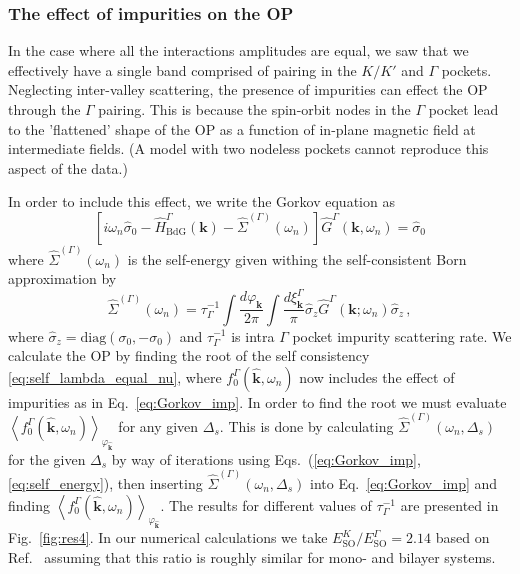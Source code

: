 \documentclass[showpacs,superscriptaddress,onecolumn,prb]{revtex4}
\begin{document}
\subsubsection{The effect of impurities on the OP}
\label{sec:Impurities}
In the case where all the interactions amplitudes are equal, we saw
that we effectively have a single band comprised of pairing in the
$K/K'$ and $\Gamma$ pockets. Neglecting inter-valley scattering, the presence of impurities can effect
the OP through the $\Gamma$ pairing. This is because the spin-orbit nodes in the $\Gamma$ pocket lead to the 'flattened' shape of the OP as a function of in-plane magnetic field at intermediate fields. (A model with two nodeless pockets cannot reproduce this aspect of the data.)

In order to include this effect, we write the Gorkov equation as
\begin{equation}
\label{eq:Gorkov_imp}
\left[i\omega_{n}\hat{\sigma}_{0}-\hat{H}_{\mathrm{BdG}}^{\Gamma}\left(\mathbf{k}\right)-\hat{\Sigma}^{\left(\Gamma\right)}\left(\omega_{n}\right)\right]\hat{G}^{\Gamma}\left(\mathbf{k},\omega_{n}\right)=\hat{\sigma}_{0}
\end{equation}
where $\hat{\Sigma}^{\left(\Gamma\right)}\left(\omega_{n}\right)$
is the self-energy given withing the self-consistent Born approximation
by \cite{Wickramaratne2021}
\begin{equation}
\label{eq:self_energy}
\hat{\Sigma}^{\left(\Gamma\right)}\left(\omega_{n}\right)=\tau^{-1}_{\Gamma}\int\frac{d\varphi_{\mathbf{k}}}{2\pi}\int\frac{d\xi_{\mathbf{k}}^{\Gamma}}{\pi}\hat{\sigma}_{z}\hat{G}^\Gamma\left(\mathbf{k};\omega_{n}\right)\hat{\sigma}_{z}\, ,
\end{equation}
where $\hat{\sigma}_{z}=\mathrm{diag}\left(\sigma_{0},-\sigma_{0}\right)$
and $\tau^{-1}_{\Gamma}$ is intra $\Gamma$ pocket impurity
scattering rate. We calculate the OP by finding the root of the self
consistency \eqref{eq:self_lambda_equal_nu}, where $f_{0}^{\Gamma}\left(\hat{\mathbf{k}},\omega_{n}\right)$
now includes the effect of impurities as in Eq.~\eqref{eq:Gorkov_imp}.
In order to find the root we must evaluate $\left\langle f_{0}^{\Gamma}\left(\hat{\mathbf{k}},\omega_{n}\right)\right\rangle_{\varphi_{\hat{\mathbf{k}}}}$ for
any given $\Delta_{s}$. This is done by calculating $\hat{\Sigma}^{\left(\Gamma\right)}\left(\omega_{n},\Delta_{s}\right)$
for the given $\Delta_{s}$ by way of iterations using Eqs.~(\ref{eq:Gorkov_imp},\ref{eq:self_energy}),
then inserting $\hat{\Sigma}^{\left(\Gamma\right)}\left(\omega_{n},\Delta_{s}\right)$
into Eq.~\eqref{eq:Gorkov_imp} and finding $\left\langle f_{0}^{\Gamma}\left(\hat{\mathbf{k}},\omega_{n}\right)\right\rangle_{\varphi_{\hat{\mathbf{k}}}} $.
The results for different values
of $\tau^{-1}_{\Gamma}$ are presented in Fig.~\ref{fig:res4}. In our numerical calculations we take $E_{\mathrm{SO}}^{K}/E_{\mathrm{SO}}^{\Gamma}=2.14$ based on  Ref.~\cite{Wickramaratne2020} assuming that this ratio is roughly similar for mono- and bilayer systems.
\end{document}
